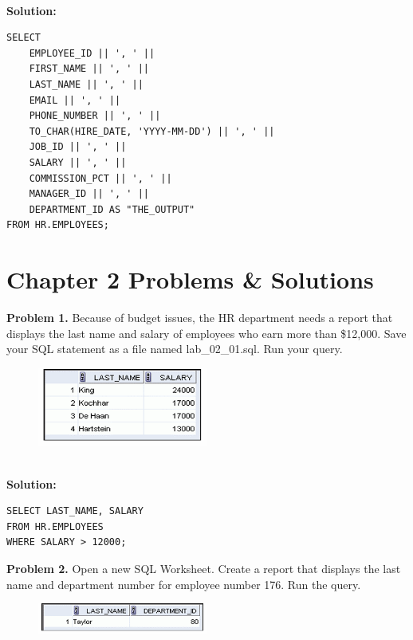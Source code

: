 \documentclass[12pt,a4paper]{article}
\begin{document}
\\\textbf{Solution:}
\begin{lstlisting}[style=sqlstyle]
SELECT
    EMPLOYEE_ID || ', ' ||
    FIRST_NAME || ', ' ||
    LAST_NAME || ', ' ||
    EMAIL || ', ' ||
    PHONE_NUMBER || ', ' ||
    TO_CHAR(HIRE_DATE, 'YYYY-MM-DD') || ', ' ||
    JOB_ID || ', ' ||
    SALARY || ', ' ||
    COMMISSION_PCT || ', ' ||
    MANAGER_ID || ', ' ||
    DEPARTMENT_ID AS "THE_OUTPUT"
FROM HR.EMPLOYEES;
\end{lstlisting}

\vspace{0.5cm}

\section{Chapter 2 Problems \& Solutions}

\textbf{Problem 1.} Because of budget issues, the HR department needs a report that displays the last name and salary of employees who earn more than \$12,000. Save your SQL statement as a file named lab\_02\_01.sql. Run your query.

\begin{figure}[htbp]
  \centering
  \includegraphics[width=0.5\textwidth]{Screenshots/21.png}
\end{figure}\\

\textbf{Solution:}
\begin{lstlisting}[style=sqlstyle]
SELECT LAST_NAME, SALARY
FROM HR.EMPLOYEES
WHERE SALARY > 12000;
\end{lstlisting}

\vspace{0.5cm}

\textbf{Problem 2.} Open a new SQL Worksheet. Create a report that displays the last name and department number for employee number 176. Run the query.
\begin{figure}[htbp]
  \centering
  \includegraphics[width=0.5\textwidth]{Screenshots/22.png}
\end{figure}\\
\end{document}
